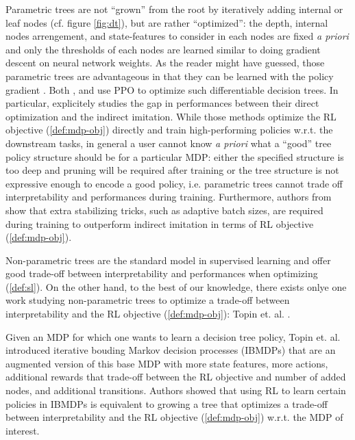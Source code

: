 Parametric trees are not ``grown'' from the root by iteratively adding internal or leaf nodes (cf. figure \ref{fig:dt}), but are rather ``optimized'': the depth, internal nodes arrengement, and state-features to consider in each nodes are fixed \textit{a priori} and only the thresholds of each nodes are learned similar to doing gradient descent on neural network weights.
As the reader might have guessed, those parametric trees are advantageous in that they can be learned with the policy gradient \cite{pg_sutton}. Both \cite{silva}, \cite{vos2024optimizinginterpretabledecisiontree} and \cite{sympol} use PPO \cite{ppo} to optimize such differentiable decision trees. In particular, \cite{sympol} explicitely studies the gap in performances between their direct optimization and the indirect imitation.
While those methods optimize the RL objective (\ref{def:mdp-obj}) directly and train high-performing policies w.r.t. the downstream tasks, in general a user cannot know \textit{a priori}  what a ``good'' tree policy structure should be for a particular MDP: either the specified structure is too deep and pruning will be required after training or the tree structure is not expressive enough to encode a good policy, i.e. parametric trees cannot trade off interpretability and performances during training.
Furthermore, authors from \cite{sympol} show that extra stabilizing tricks, such as adaptive batch sizes, are required during training to outperform indirect imitation in terms of RL objective (\ref{def:mdp-obj}).

Non-parametric trees are the standard model in supervised learning \cite{breiman1984classification,ID3,c45} and offer good trade-off between interpretability and performances when optimizing (\ref{def:sl}).
On the other hand, to the best of our knowledge, there exists onlye one work studying non-parametric trees to optimize a trade-off between interpretability and the RL objective (\ref{def:mdp-obj}): Topin et. al. \cite{topin2021iterative}.

Given an MDP for which one wants to learn a decision tree policy, Topin et. al. introduced iterative bouding Markov decision processes (IBMDPs) that are an augmented version of this base MDP with more state features, more actions, additional rewards that trade-off between the RL objective and number of added nodes, and additional transitions.
Authors showed that using RL to learn certain policies in IBMDPs is equivalent to growing a tree that optimizes a trade-off between interpretability and the RL objective (\ref{def:mdp-obj}) w.r.t. the MDP of interest.

